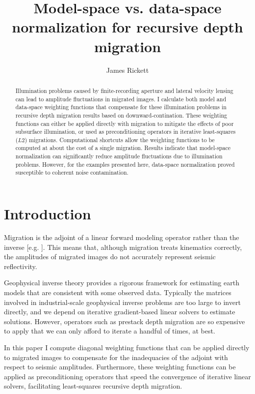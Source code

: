 \title{Model-space vs. data-space normalization for recursive 
depth migration}  

\author{James Rickett}
\maketitle

\begin{abstract}
Illumination problems caused by finite-recording aperture and lateral 
velocity lensing can lead to amplitude fluctuations in migrated
images. 
I calculate both model and data-space weighting functions that
compensate for these illumination problems in recursive depth
migration results based on downward-contination. 
These weighting functions can either be applied directly with 
migration to mitigate the effects of poor subsurface 
illumination, or used as preconditioning operators in iterative
least-squares ($L2$) migrations.
Computational shortcuts allow the weighting functions to be computed 
at about the cost of a single migration.
Results indicate that model-space normalization can significantly
reduce amplitude fluctuations due to illumination
problems. 
However, for the examples presented here, data-space normalization
proved susceptible to coherent noise contamination.
\end{abstract}

\section{Introduction}
Migration is the adjoint of a linear forward modeling 
operator rather than the inverse [e.g. ]. 
This means that, although migration treats kinematics correctly, the 
amplitudes of migrated images do not accurately represent seismic
reflectivity. 

\par
Geophysical inverse theory provides a rigorous framework for
estimating earth models that are consistent with some observed
data.  
Typically the matrices involved in industrial-scale geophysical
inverse problems are too large to invert directly, and we depend on 
iterative gradient-based linear solvers to estimate solutions.
However, operators such as prestack depth migration are so expensive
to apply that we can only afford to iterate a handful of times, at
best.  

\par
In this paper I compute diagonal weighting functions that can be
applied directly to migrated images to compensate for the inadequacies
of the adjoint with respect to seismic amplitudes.
Furthermore, these weighting functions can be applied as
preconditioning operators that speed the convergence of iterative
linear solvers, facilitating least-squares recursive depth 
migration.  

